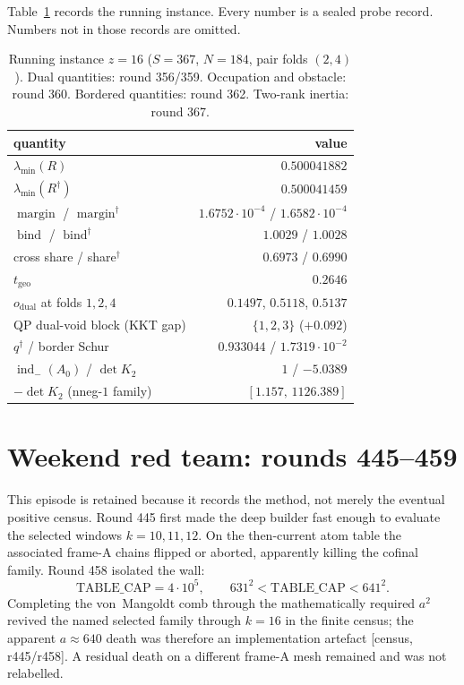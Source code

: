 \documentclass[11pt]{article}
\theoremstyle{remark}
\newcommand{\Rd}{R^{\dagger}}
\newcommand{\gr}[1]{\textnormal{\small[#1]}}
\begin{document}
Table~\ref{tab:w9} records the running instance.  Every number is a
sealed probe record.  Numbers not in those records are omitted.

\begin{table}[ht]
\centering
\caption{Running instance $z=16$ ($S=367$, $N=184$, pair folds
$(2,4)$).  Dual quantities: round 356/359.  Occupation and
obstacle: round 360.  Bordered quantities: round 362.
Two-rank inertia: round 367.}
\label{tab:w9}
\begin{tabular}{lr}
\toprule
quantity & value \\
\midrule
$\lambda_{\min}(R)$ & $0.500041882$ \\
$\lambda_{\min}(\Rd)$ & $0.500041459$ \\
$\operatorname{margin}$ / $\operatorname{margin}^{\dagger}$ &
  $1.6752\cdot10^{-4}$ / $1.6582\cdot10^{-4}$ \\
$\operatorname{bind}$ / $\operatorname{bind}^{\dagger}$ &
  $1.0029$ / $1.0028$ \\
cross share / share$^{\dagger}$ & $0.6973$ / $0.6990$ \\
$t_{\mathrm{geo}}$ & $0.2646$ \\
$o_{\mathrm{dual}}$ at folds $1,2,4$ & $0.1497$, $0.5118$, $0.5137$ \\
QP dual-void block (KKT gap) & $\{1,2,3\}$ ($+0.092$) \\
$q^{\dagger}$ / border Schur & $0.933044$ / $1.7319\cdot10^{-2}$ \\
$\operatorname{ind}_{-}(A_{0})$ / $\det K_{2}$ &
  $1$ / $-5.0389$ \\
$-\det K_{2}$ (nneg-$1$ family) & $[1.157,\,1126.389]$ \\
\bottomrule
\end{tabular}
\end{table}

\section{Weekend red team: rounds 445--459}\label{sec:methodology}

This episode is retained because it records the method, not merely
the eventual positive census.  Round 445 first made the deep builder
fast enough to evaluate the selected windows $k=10,11,12$.  On the
then-current atom table the associated frame-A chains flipped or
aborted, apparently killing the cofinal family.  Round 458 isolated
the wall:
\[
\mathrm{TABLE\_CAP}=4\cdot10^{5},\qquad
631^{2}<\mathrm{TABLE\_CAP}<641^{2}.
\]
Completing the von~Mangoldt comb through the mathematically required
$a^{2}$ revived the named selected family through $k=16$ in the
finite census; the apparent $a\approx640$ death was therefore an
implementation artefact \gr{census, r445/r458}.  A residual death on
a different frame-A mesh remained and was not relabelled.
\end{document}
